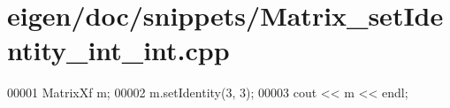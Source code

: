 \hypertarget{eigen_2doc_2snippets_2_matrix__set_identity__int__int_8cpp_source}{}\section{eigen/doc/snippets/\+Matrix\+\_\+set\+Identity\+\_\+int\+\_\+int.cpp}
\label{eigen_2doc_2snippets_2_matrix__set_identity__int__int_8cpp_source}

\begin{DoxyCode}
00001 MatrixXf m;
00002 m.setIdentity(3, 3);
00003 cout << m << endl;
\end{DoxyCode}
